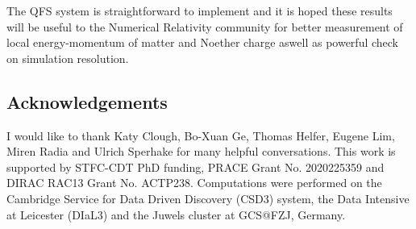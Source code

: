The QFS system is straightforward to implement and it is hoped these results will be useful to the Numerical Relativity community for better measurement of local energy-momentum of matter and Noether charge aswell as powerful check on simulation resolution.


\subsection*{Acknowledgements} \label{q:sect:thanks}
I would like to thank Katy Clough, Bo-Xuan Ge, Thomas Helfer, Eugene Lim, Miren Radia and Ulrich Sperhake for many helpful conversations. This work is supported by STFC-CDT PhD funding, PRACE Grant No. 2020225359 and DIRAC RAC13 Grant
No. ACTP238. Computations were performed on the Cambridge Service for Data Driven Discovery (CSD3) system, the Data Intensive at Leicester (DIaL3) and the Juwels cluster at GCS@FZJ, Germany. 







